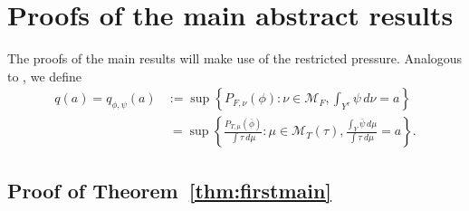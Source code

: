 \documentclass[12pt]{article}
\numberwithin{equation}{section}
\newcommand{\F}{F}
\begin{document}
\section{Proofs of the main abstract results}
\label{sec:proofmainth}



The proofs of the main results will make use of the restricted pressure. 
Analogous to \cite[Definition 5.1]{RuhSar22}, we define 
\begin{align*}
q(a) = q_{\phi, \psi}(a) & := \sup\left\{P_{\F, \nu}(\phi):\nu\in\mathcal{M}_{\F},\int_{Y^\tau}\psi\, d\nu=a \right\} \\
&\ =  \sup\left\{\frac{P_{T, \mu}(\bar\phi)}{\int\tau~d\mu}:\mu\in\mathcal{M}_T(\tau),\frac{\int_{Y}\bar\psi\, d\mu}{\int\tau~d\mu}=a \right\}.
\end{align*}



\subsection{Proof of Theorem~\ref{thm:firstmain}}
\end{document}
